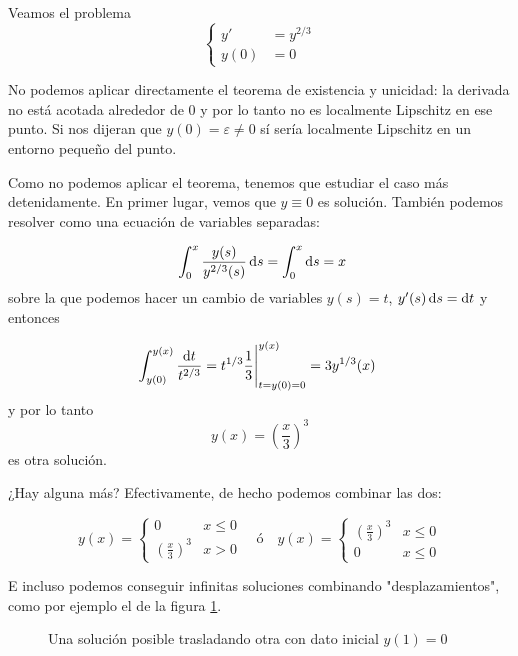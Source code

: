 \documentclass{mathnotes}
\begin{document}
\begin{example}
Veamos el problema \[ \begin{cases} y' &= y^{2/3} \\ y(0) &= 0 \end{cases} \]

No podemos aplicar directamente el teorema de existencia y unicidad: la derivada no está acotada alrededor de 0 y por lo tanto no es localmente Lipschitz en ese punto. Si nos dijeran que $y(0) = ε ≠ 0$ sí sería localmente Lipschitz en un entorno pequeño del punto.

Como no podemos aplicar el teorema, tenemos que estudiar el caso más detenidamente. En primer lugar, vemos que $y\equiv 0$ es solución. También podemos resolver como una ecuación de variables separadas:

\[ \int_0^x \frac{y(s)}{y^{2/3}(s)} \dif s = \int_0^x \dif s = x \] sobre la que podemos hacer un cambio de variables $y(s) = t$, $y'(s) \dif s = \dif t$ y entonces

\[ \int_{y(0)}^{y(x)} \frac{\dif t}{t^{2/3}} = \eval{t^{1/3}{\frac{1}{3}}}_{t=y(0)=0}^{y(x)} = 3y^{1/3}(x) 
\] 
y por lo tanto \[ y(x) = \left(\frac{x}{3}\right)^3 \] es otra solución.

¿Hay alguna más? Efectivamente, de hecho podemos combinar las dos:

\[ y(x) = \begin{cases}
0 & x ≤ 0 \\
\left(\frac{x}{3}\right)^3 & x > 0
\end{cases}\quad \text{\'o} \quad y(x) = \begin{cases}
\left(\frac{x}{3}\right)^3 & x ≤ 0 \\
0 & x ≤ 0\end{cases} \]

E incluso podemos conseguir infinitas soluciones combinando "desplazamientos", como por ejemplo el de la figura \ref{imgInfSoluciones}.
\end{example}

\begin{figure}[hbtp]
\centering
{}
\label{imgInfSoluciones}
\caption{Una solución posible trasladando otra con dato inicial $y(1) = 0$}
\end{figure}
\end{document}
